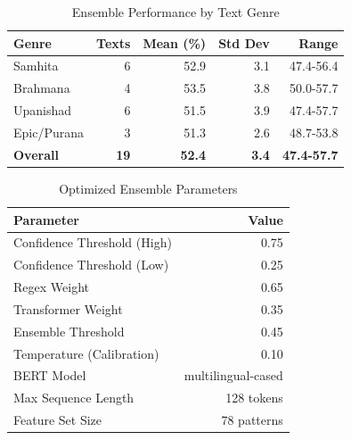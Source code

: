 \begin{table}[h]
\centering
\caption{Ensemble Performance by Text Genre}
\label{tab:genre}
\begin{tabular}{lrrrr}
\toprule
\textbf{Genre} & \textbf{Texts} & \textbf{Mean (\%)} & \textbf{Std Dev} & \textbf{Range} \\
\midrule
Samhita & 6 & 52.9 & 3.1 & 47.4-56.4 \\
Brahmana & 4 & 53.5 & 3.8 & 50.0-57.7 \\
Upanishad & 6 & 51.5 & 3.9 & 47.4-57.7 \\
Epic/Purana & 3 & 51.3 & 2.6 & 48.7-53.8 \\
\midrule
\textbf{Overall} & \textbf{19} & \textbf{52.4} & \textbf{3.4} & \textbf{47.4-57.7} \\
\bottomrule
\end{tabular}
\end{table}

\begin{table}[h]
\centering
\caption{Optimized Ensemble Parameters}
\label{tab:ensemble}
\begin{tabular}{lr}
\toprule
\textbf{Parameter} & \textbf{Value} \\
\midrule
Confidence Threshold (High) & 0.75 \\
Confidence Threshold (Low) & 0.25 \\
Regex Weight & 0.65 \\
Transformer Weight & 0.35 \\
Ensemble Threshold & 0.45 \\
Temperature (Calibration) & 0.10 \\
\midrule
BERT Model & multilingual-cased \\
Max Sequence Length & 128 tokens \\
Feature Set Size & 78 patterns \\
\bottomrule
\end{tabular}
\end{table}